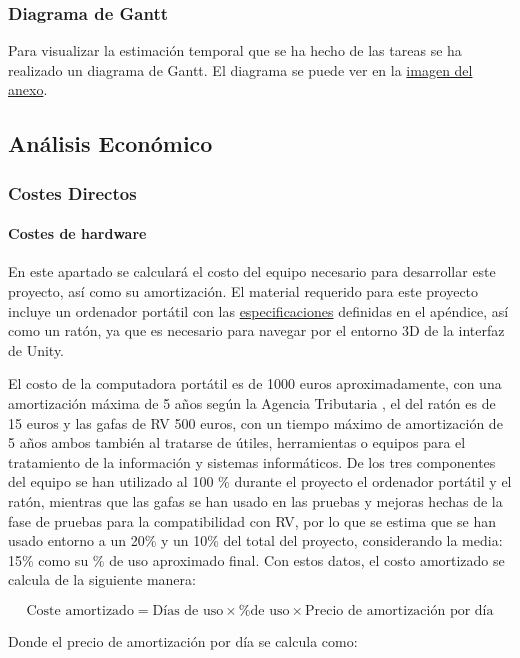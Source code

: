         \subsubsection{Diagrama de Gantt}
        Para visualizar la estimación temporal que se ha hecho de las tareas se ha realizado un diagrama de Gantt. El diagrama se puede ver en la \hyperref[fig:gantt]{imagen del anexo}.


    \subsection{Análisis Económico}

        \subsubsection{Costes Directos}
            \paragraph{Costes de hardware}
            En este apartado se calculará el costo del equipo necesario para desarrollar este proyecto, así como su amortización. El material requerido para este proyecto incluye un ordenador portátil con las \hyperref[subsec:Especificación del Equipo]{especificaciones} definidas en el apéndice, así como un ratón, ya que es necesario para navegar por el entorno 3D de la interfaz de Unity.

            El costo de la computadora portátil es de 1000 euros aproximadamente, con una amortización máxima de 5 años según la Agencia Tributaria \cite{agencia_tributaria_tabla_2024}, el del ratón es de 15 euros y las gafas de RV 500 euros, con un tiempo máximo de amortización de 5 años ambos también al tratarse de útiles, herramientas o equipos para el tratamiento de la información y sistemas informáticos. De los tres componentes del equipo se han utilizado al 100 \% durante el proyecto el ordenador portátil y el ratón, mientras que las gafas se han usado en las pruebas y mejoras hechas de la fase de pruebas para la compatibilidad con RV, por lo que se estima que se han usado entorno a un 20\% y un 10\% del total del proyecto, considerando la media: 15\% como su \% de uso aproximado final. Con estos datos, el costo amortizado se calcula de la siguiente manera:

            \[ \text{Coste amortizado} = \text{Días de uso} \times \text{\% de uso} \times \text{Precio de amortización por día} \]

            Donde el precio de amortización por día se calcula como:

